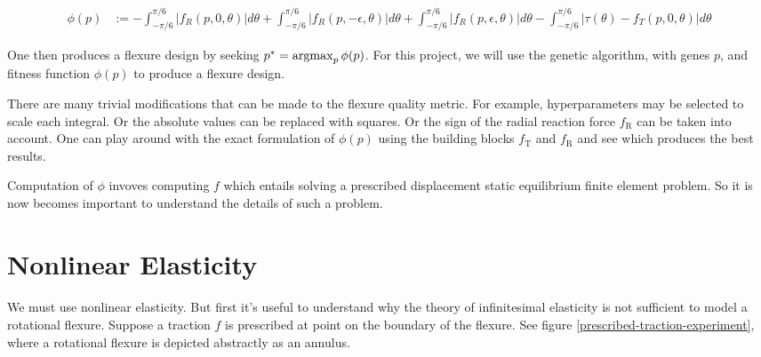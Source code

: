 \documentclass[11pt,letterpaper]{article}
\begin{document}
\[\begin{aligned}
    \phi(p) &:=  -\int_{-\pi/6}^{\pi/6} |f_{R}(p, 0, \theta)| d\theta + \int_{-\pi/6}^{\pi/6} |f_{R}(p, - \epsilon, \theta) | d\theta + \int_{-\pi/6}^{\pi/6} |f_{R}(p, \epsilon, \theta)| d\theta 
- \int_{-\pi/6}^{\pi/6} |\tau(\theta)  - f_T(p, 0, \theta)|d\theta
  \end{aligned}
\]

One then produces a flexure design by seeking $p^* = \mathop{\rm argmax}_p \phi(p)$. For this project, we will use the genetic algorithm, with genes $p$, and fitness function $\phi(p)$ to produce a flexure design.

There are many trivial modifications that can be made to the flexure quality metric. For example, hyperparameters may be selected to scale each integral. Or the absolute values can be replaced with squares. Or the sign of the radial reaction force $f_\text{R}$ can be taken into account. One can play around with the exact formulation of $\phi(p)$ using the building blocks $f_\text{T}$ and $f_\text{R}$ and see which produces the best results. 

Computation of $\phi$ invoves computing $f$ which entails solving a prescribed displacement static equilibrium finite element problem. So it is now becomes important to understand the details of such a problem.

\section{Nonlinear Elasticity}
\paragraph{}
We must use nonlinear elasticity. But first it's useful to understand why the theory of infinitesimal elasticity is not sufficient to model a rotational flexure. Suppose a traction $f$ is prescribed at point on the boundary of the flexure. See figure \ref{prescribed-traction-experiment}, where a rotational flexure is depicted abstractly as an annulus.
\end{document}
